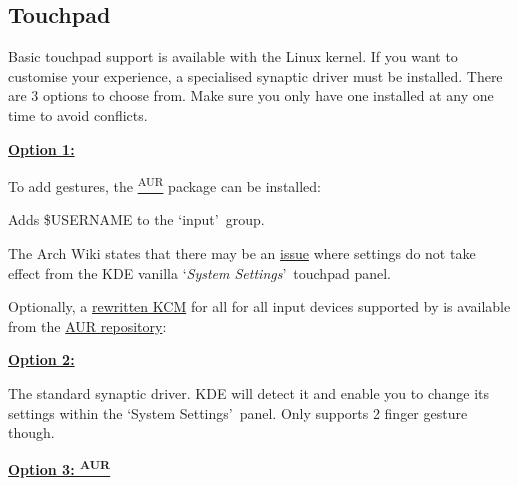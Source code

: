 \subsection{Touchpad}

Basic touchpad support is available with the Linux kernel. If you want to customise your experience, a specialised synaptic driver must be installed. There are 3 options to choose from. Make sure you only have one installed at any one time to avoid conflicts.

\vspace*{1em}
\textbf{\textcolor{textgrey}{\uline{Option 1: \href{https://wiki.archlinux.org/index.php/Libinput}{}}}}


To add gestures, the  \href{https://github.com/bulletmark/libinput-gestures}{\textsuperscript{AUR}} package can be installed:

	\begin{blocksection}
		Adds \textcolor{codekeyword1}{\$USERNAME} to the \lq input\rq\ group.
	\end{blocksection}

The Arch Wiki states that there may be an \href{https://wiki.archlinux.org/index.php/Libinput#Touchpad_settings_not_taking_effect_in_KDE.27s_Touchpad_KCM}{issue} where settings do not take effect from the KDE vanilla \lq\textit{System Settings}\rq\ touchpad panel. 

Optionally, a \href{https://github.com/amezin/pointing-devices-kcm}{rewritten KCM} for all for all input devices supported by  is available from the  \href{https://aur.archlinux.org/packages/kcm-pointing-devices-git/}{AUR repository}:


\vspace*{1em}
\textbf{\textcolor{textgrey}{\uline{Option 2: }}}

The standard synaptic driver. KDE will detect it and enable you to change its settings within the \lq System Settings\rq\ panel. Only supports 2 finger gesture though.


\vspace*{1em}
\textbf{\textcolor{textgrey}{\uline{Option 3: \textsuperscript{AUR}}}}


